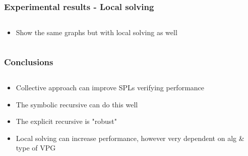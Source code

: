\documentclass[handout,aspectratio=169]{beamer}
\begin{document}

\begin{frame}[t]
\frametitle{Experimental results - Local solving}
\begin{columns}[t]
	\begin{column}{0.5\textwidth}
		\begin{itemize}
			\item Show the same graphs but with local solving as well
		\end{itemize}
	\end{column}
	\begin{column}{0.5\textwidth}
	\end{column}
\end{columns}
\end{frame}


\begin{frame}[t]
\frametitle{Conclusions}
\begin{columns}[t]
	\begin{column}{0.5\textwidth}
		\begin{itemize}
			\item Collective approach can improve SPLs verifying performance
			\item The symbolic recursive can do this well
			\item The explicit recursive is "robust"
			\item Local solving can increase performance, however very dependent on alg \& type of VPG
		\end{itemize}
	\end{column}
	\begin{column}{0.5\textwidth}
	\end{column}
\end{columns}
\end{frame}

\end{document}
